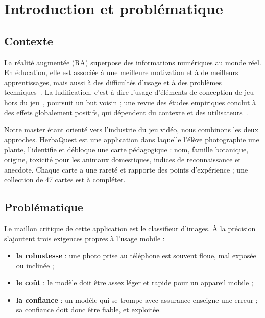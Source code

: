 \documentclass[conference]{IEEEtran}
\newcommand{\todo}{\textcolor{red}{\textbf{??}}}
\newcommand{\nClasses}{47}\newcommand{\imbalance}{\todo}\newcommand{\nDup}{\todo}
\begin{document}
\section{Introduction et problématique}
\subsection{Contexte}
La réalité augmentée (RA) superpose des informations numériques au monde réel. En éducation, elle est associée à une meilleure motivation et à de meilleurs apprentissages, mais aussi à des difficultés d'usage et à des problèmes techniques~\cite{akcayir2017}. La ludification, c'est-à-dire l'usage d'éléments de conception de jeu hors du jeu~\cite{deterding2011}, poursuit un but voisin ; une revue des études empiriques conclut à des effets globalement positifs, qui dépendent du contexte et des utilisateurs~\cite{hamari2014}.

Notre master étant orienté vers l'industrie du jeu vidéo, nous combinons les deux approches. HerbaQuest est une application dans laquelle l'élève photographie une plante, l'identifie et débloque une carte pédagogique : nom, famille botanique, origine, toxicité pour les animaux domestiques, indices de reconnaissance et anecdote. Chaque carte a une rareté et rapporte des points d'expérience ; une collection de \nClasses{} cartes est à compléter.

\subsection{Problématique}
Le maillon critique de cette application est le classifieur d'images. À la précision s'ajoutent trois exigences propres à l'usage mobile :
\begin{itemize}
\item \textbf{la robustesse} : une photo prise au téléphone est souvent floue, mal exposée ou inclinée ;
\item \textbf{le coût} : le modèle doit être assez léger et rapide pour un appareil mobile ;
\item \textbf{la confiance} : un modèle qui se trompe avec assurance enseigne une erreur ; sa confiance doit donc être fiable, et exploitée.
\end{itemize}
\end{document}

